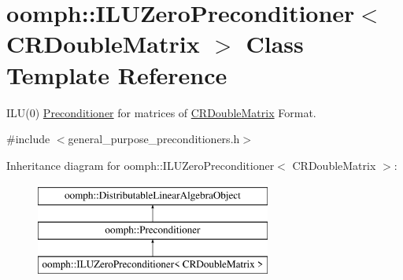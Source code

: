 \hypertarget{classoomph_1_1ILUZeroPreconditioner_3_01CRDoubleMatrix_01_4}{}\section{oomph\+:\+:I\+L\+U\+Zero\+Preconditioner$<$ C\+R\+Double\+Matrix $>$ Class Template Reference}
\label{classoomph_1_1ILUZeroPreconditioner_3_01CRDoubleMatrix_01_4}


I\+L\+U(0) \hyperlink{classoomph_1_1Preconditioner}{Preconditioner} for matrices of \hyperlink{classoomph_1_1CRDoubleMatrix}{C\+R\+Double\+Matrix} Format.  




{\ttfamily \#include $<$general\+\_\+purpose\+\_\+preconditioners.\+h$>$}

Inheritance diagram for oomph\+:\+:I\+L\+U\+Zero\+Preconditioner$<$ C\+R\+Double\+Matrix $>$\+:\begin{figure}[H]
\begin{center}
\leavevmode
\includegraphics[height=3.000000cm]{classoomph_1_1ILUZeroPreconditioner_3_01CRDoubleMatrix_01_4}
\end{center}
\end{figure}
